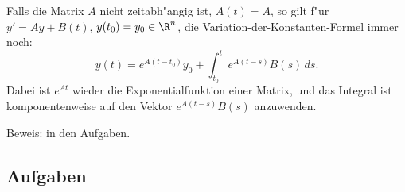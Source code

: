 \begin{sbem}
Falls die Matrix $A$ nicht zeitabh"angig ist, $A(t)=A$,   
so gilt f"ur $y' = Ay+B(t)$,  $y(t_0)=y_0\in\R^n$, die Variation-der-Konstanten-Formel immer noch: 
$$ y(t) = e^{A(t-t_0)} y_0 + \int_{t_0}^t e^{A(t-s)} B(s)\, ds.$$
Dabei ist $e^{A t}$ wieder die Exponentialfunktion einer Matrix, und das 
Integral ist komponentenweise auf den Vektor $ e^{A(t-s)} B(s)$ anzuwenden.
\end{sbem}
Beweis: in den Aufgaben.
\subsection*{Aufgaben}
\begin{auf}\chb\label{block2A6a}

\end{auf}
\begin{auf}\chb\label{block2A6}

\end{auf}
\begin{auf}\chb\label{block2A7}

\end{auf}





